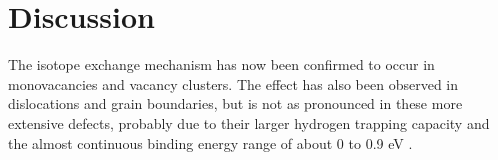 \section{Discussion}
The isotope exchange mechanism has now been confirmed to occur in monovacancies and vacancy clusters. 
The effect has also been observed in dislocations and grain boundaries, but is not as pronounced in these more extensive defects, probably due to their larger hydrogen trapping capacity and the almost continuous binding energy range of about 0 to 0.9 eV \cite{grigorev2015interaction}.


